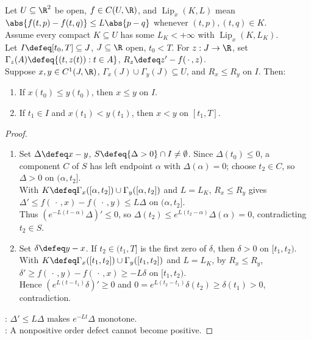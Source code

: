 \begin{theorem} \label{thm:scalar-lipschitz-comparison} \\
Let $U\subseteq\R^2$ be open, $f\in C(U,\R)$, and $\operatorname{Lip}_x(K,L)$ mean $\abs{f(t,p)-f(t,q)}\leq L\abs{p-q}$ whenever $(t,p),(t,q)\in K$.\\
Assume every compact $K\subseteq U$ has some $L_K<+\infty$ with $\operatorname{Lip}_x(K,L_K)$.\\
Let $I\defeq[t_0,T]\subseteq J$, $J\subseteq\R$ open, $t_0<T$. For $z:J\to\R$, set $\Gamma_z(A)\defeq\{(t,z(t)):t\in A\}$, $R_z\defeq z'-f(\,\cdot\,,z)$.\\
Suppose $x,y\in C^1(J,\R)$, $\Gamma_x(J)\cup\Gamma_y(J)\subseteq U$, and $R_x\leq R_y$ on $I$. Then:
\begin{enumerate}[label=(\roman*)]
\setlength{\itemsep}{0pt}
\item If $x(t_0)\leq y(t_0)$, then $x\leq y$ on $I$.
\item If $t_1\in I$ and $x(t_1)<y(t_1)$, then $x<y$ on $[t_1,T]$.
\end{enumerate}
\begin{proof}
\begin{enumerate}[label=(\roman*)]
\setlength{\itemsep}{0pt}
\item Set $\Delta\defeq x-y$, $S\defeq\{\Delta>0\}\cap I\neq\emptyset$. Since $\Delta(t_0)\leq0$, a component $C$ of $S$ has left endpoint $\alpha$ with $\Delta(\alpha)=0$; choose $t_2\in C$, so $\Delta>0$ on $(\alpha,t_2]$.\\
With $K\defeq\Gamma_x([\alpha,t_2])\cup\Gamma_y([\alpha,t_2])$ and $L=L_K$, $R_x\leq R_y$ gives $\Delta'\leq f(\,\cdot\,,x)-f(\,\cdot\,,y)\leq L\Delta$ on $(\alpha,t_2]$.\\
Thus $(e^{-L(t-\alpha)}\Delta)'\leq0$, so $\Delta(t_2)\leq e^{L(t_2-\alpha)}\Delta(\alpha)=0$, contradicting $t_2\in S$.
\item Set $\delta\defeq y-x$. If $t_2\in(t_1,T]$ is the first zero of $\delta$, then $\delta>0$ on $[t_1,t_2)$.\\
With $K\defeq\Gamma_x([t_1,t_2])\cup\Gamma_y([t_1,t_2])$ and $L=L_K$, by $R_x\leq R_y$, $\delta'\geq f(\,\cdot\,,y)-f(\,\cdot\,,x)\geq-L\delta$ on $[t_1,t_2)$.\\
Hence $(e^{L(t-t_1)}\delta)'\geq0$ and $0=e^{L(t_2-t_1)}\delta(t_2)\geq\delta(t_1)>0$, contradiction.
\end{enumerate}
: $\Delta'\leq L\Delta$ makes $e^{-Lt}\Delta$ monotone.\\
: A nonpositive order defect cannot become positive.
\end{proof}
\end{theorem}


